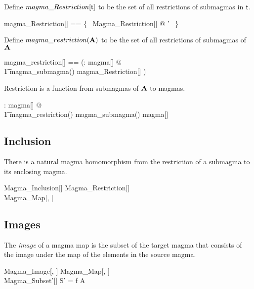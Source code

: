 \documentclass{amsart}
\begin{document}
Define $magma\_Restriction[\mathsf{t}]$ to be the set of all restrictions of submagmas in $\mathsf{t}$.

\begin{zed}
	magma\_Restriction[\genT] == \{~ Magma\_Restriction[\genT] @ \strucS \mapsto \strucA' ~\}
\end{zed}

Define $magma\_restriction(\mathbf{A})$ to be the set of all restrictions of submagmas of $\mathbf{A}$

\begin{zed}
	magma\_restriction[\genT] == (\lambda \strucA: magma[\genT] @ \\
	\t1	magma\_submagma(\strucA) \dres magma\_Restriction[\genT] )
\end{zed}

\begin{remark}
Restriction is a function from submagmas of $\mathbf{A}$ to magmas.

\begin{zed}
	\forall \strucA: magma[\setT] @ \\
	\t1	magma\_restriction(\strucA) \in magma\_submagma(\strucA) \fun magma[\setT]
\end{zed}

\end{remark}

\subsection{Inclusion}

There is a natural magma homomorphism from the restriction of a submagma to its
enclosing magma.

\begin{schema}{Magma\_Inclusion}[\genT]
	Magma\_Restriction[\genT] \\
	Magma\_Map[\genT, \genT]

\end{schema}

\subsection{Images}

The \textit{image} of a magma map is the subset of the target magma that consists of
the image under the map of the elements in the source magma.

\begin{schema}{Magma\_Image}[\genT, \genU]
	Magma\_Map[\genT, \genU] \\
	Magma\_Subset'[\genU]
\where
	S' = f \limg A \rimg
\end{schema}
\end{document}
